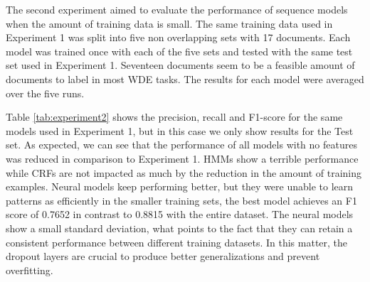\documentclass[sigconf]{acmart}
\begin{document}
The second experiment aimed to evaluate the performance of sequence models when 
the amount of training data is small. The same training data used in Experiment 1 was
split into five non overlapping sets with 17 documents. Each model was trained once 
with each of the five sets and tested with the same test set used in Experiment 1. 
Seventeen documents seem to be a feasible amount of documents to label in most WDE 
tasks. The results for each model were averaged over the five runs.

Table \ref{tab:experiment2} shows the precision, recall and F1-score for the same models
used in Experiment 1, but in this case we only show results for the Test set.
As expected, we can see that the performance of all models with no features was reduced in comparison 
to Experiment 1. HMMs show a terrible performance while CRFs are not 
impacted as much by the reduction in the amount of training examples. Neural models
keep performing better, but they were unable to learn patterns as efficiently in
the smaller training sets, the best model achieves an F1 score of 0.7652 in contrast to
0.8815 with the entire dataset. The neural models show a small standard deviation, what
points to the fact that they can retain a consistent performance between different training 
datasets. In this matter, the dropout layers are crucial to produce better generalizations 
and prevent overfitting.
\end{document}
